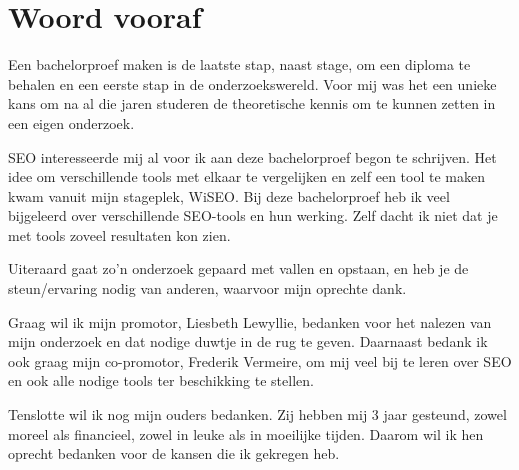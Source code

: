 \chapter*{Woord vooraf}
\label{ch:voorwoord}

Een bachelorproef maken is de laatste stap, naast stage, om een diploma te behalen en een eerste stap in de onderzoekswereld. Voor mij was het een unieke kans om na al die jaren studeren de theoretische kennis om te kunnen zetten in een eigen onderzoek.

SEO interesseerde mij al voor ik aan deze bachelorproef begon te schrijven. Het idee om verschillende tools met elkaar te vergelijken en zelf een tool te maken kwam vanuit mijn stageplek, WiSEO. Bij deze bachelorproef heb ik veel bijgeleerd over verschillende SEO-tools en hun werking. Zelf dacht ik niet dat je met tools zoveel resultaten kon zien. 

Uiteraard gaat zo'n onderzoek gepaard met vallen en opstaan, en heb je de steun/ervaring nodig van anderen, waarvoor mijn oprechte dank. 

Graag wil ik mijn promotor, Liesbeth Lewyllie, bedanken voor het nalezen van mijn onderzoek en dat nodige duwtje in de rug te geven. Daarnaast bedank ik ook graag mijn co-promotor, Frederik Vermeire, om mij veel bij te leren over SEO en ook alle nodige tools ter beschikking te stellen. 

Tenslotte wil ik nog mijn ouders bedanken. Zij hebben mij 3 jaar gesteund, zowel moreel als financieel, zowel in leuke als in moeilijke tijden. Daarom wil ik hen oprecht bedanken voor de kansen die ik gekregen heb. 